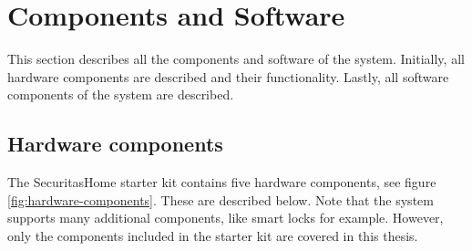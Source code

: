\section{Components and Software} \label{ch:system:components}
This section describes all the components and software of the system. Initially, all hardware components are described and their functionality. Lastly, all software components of the system are described.

\subsection{Hardware components} \label{ch:system:hardware}
The SecuritasHome starter kit contains five hardware components, see figure \ref{fig:hardware-components}. These are described below. Note that the system supports many additional components, like smart locks for example. However, only the components included in the starter kit are covered in this thesis.
